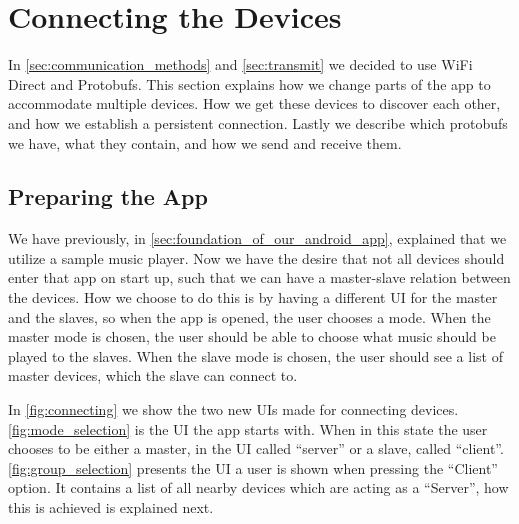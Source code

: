 \section{Connecting the Devices}
In \cref{sec:communication_methods} and \cref{sec:transmit} we decided to use WiFi Direct and Protobufs.
This section explains how we change parts of the app to accommodate multiple devices.
How we get these devices to discover each other, and how we establish a persistent connection.
Lastly we describe which protobufs we have, what they contain, and how we send and receive them.

\subsection{Preparing the App}
We have previously, in \cref{sec:foundation_of_our_android_app}, explained that we utilize a sample music player.
Now we have the desire that not all devices should enter that app on start up, such that we can have a master-slave relation between the devices.
How we choose to do this is by having a different UI for the master and the slaves, so when the app is opened, the user chooses a mode.
When the master mode is chosen, the user should be able to choose what music should be played to the slaves.
When the slave mode is chosen, the user should see a list of master devices, which the slave can connect to. 

In \cref{fig:connecting} we show the two new UIs made for connecting devices.
\cref{fig:mode_selection} is the UI the app starts with.
When in this state the user chooses to be either a master, in the UI called ``server'' or a slave, called ``client''.
\cref{fig:group_selection} presents the UI a user is shown when pressing the ``Client'' option.
It contains a list of all nearby devices which are acting as a ``Server'', how this is achieved is explained next.


